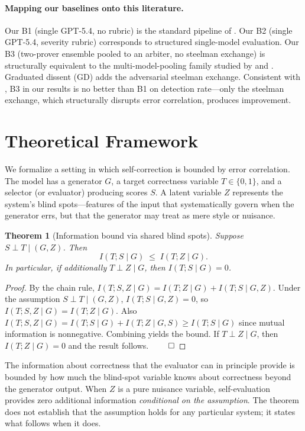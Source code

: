 \documentclass[11pt]{article}
\newtheorem{theorem}{Theorem}
\theoremstyle{definition}
\begin{document}
\paragraph{Mapping our baselines onto this literature.} Our B1 (single GPT-5.4, no rubric) is the standard pipeline of \citet{liang2024can}. Our B2 (single GPT-5.4, severity rubric) corresponds to structured single-model evaluation. Our B3 (two-prover ensemble pooled to an arbiter, no steelman exchange) is structurally equivalent to the multi-model-pooling family studied by \citet{wang2023self} and \citet{du2023debate}. Graduated dissent (GD) adds the adversarial steelman exchange. Consistent with \citet{huang2024self}, B3 in our results is no better than B1 on detection rate---only the steelman exchange, which structurally disrupts error correlation, produces improvement.

\section{Theoretical Framework}
\label{sec:theory}

We formalize a setting in which self-correction is bounded by error correlation. The model has a generator $G$, a target correctness variable $T \in \{0, 1\}$, and a selector (or evaluator) producing scores $S$. A latent variable $Z$ represents the system's blind spots---features of the input that systematically govern when the generator errs, but that the generator may treat as mere style or nuisance.

\begin{theorem}[Information bound via shared blind spots]
\label{thm:info_bound}
Suppose $S \perp T \mid (G, Z)$. Then
\[
I(T; S \mid G) \;\leq\; I(T; Z \mid G).
\]
In particular, if additionally $T \perp Z \mid G$, then $I(T; S \mid G) = 0$.
\end{theorem}
\begin{proof}
By the chain rule, $I(T; S, Z \mid G) = I(T; Z \mid G) + I(T; S \mid G, Z)$. Under the assumption $S \perp T \mid (G, Z)$, $I(T; S \mid G, Z) = 0$, so $I(T; S, Z \mid G) = I(T; Z \mid G)$. Also $I(T; S, Z \mid G) = I(T; S \mid G) + I(T; Z \mid G, S) \geq I(T; S \mid G)$ since mutual information is nonnegative. Combining yields the bound. If $T \perp Z \mid G$, then $I(T; Z \mid G) = 0$ and the result follows. $\hfill\qed$
\end{proof}

The information about correctness that the evaluator can in principle provide is bounded by how much the blind-spot variable knows about correctness beyond the generator output. When $Z$ is a pure nuisance variable, self-evaluation provides zero additional information \emph{conditional on the assumption}. The theorem does not establish that the assumption holds for any particular system; it states what follows when it does.
\end{document}
